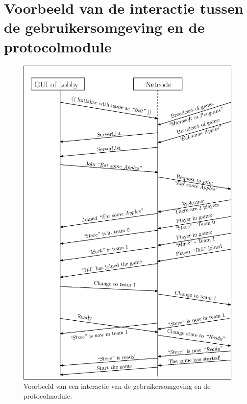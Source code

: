 \documentclass[a4paper,11pt, twoside]{article}
\begin{document}
    \section{Voorbeeld van de interactie tussen de gebruikersomgeving en de protocolmodule}
    \label{sec:interactscenmodel}
    \begin{figure}[h]
    	\centering
	\includegraphics[height=0.7\textheight]{../Class-diagram/MSCLobby-console.eps}
	\caption{Voorbeeld van een interactie van de gebruikersomgeving en de protocolmodule.}
    \end{figure}
    \label{app:MSCLobbyCon}
    
\end{document}
